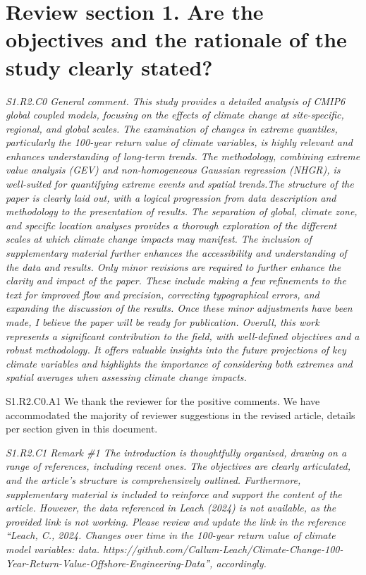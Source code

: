 \documentclass[a4paper,10pt]{article}
\begin{document}
	\section*{Review section 1. Are the objectives and the rationale of the study clearly stated?}
	\emph{S1.R2.C0 General comment. This study provides a detailed analysis of CMIP6 global coupled models, focusing on the effects of climate change at site-specific, regional, and global scales. The examination of changes in extreme quantiles, particularly the 100-year return value of climate variables, is highly relevant and enhances understanding of long-term trends. The methodology, combining extreme value analysis (GEV) and non-homogeneous Gaussian regression (NHGR), is well-suited for quantifying extreme events and spatial trends.The structure of the paper is clearly laid out, with a logical progression from data description and methodology to the presentation of results. The separation of global, climate zone, and specific location analyses provides a thorough exploration of the different scales at which climate change impacts may manifest. The inclusion of supplementary material further enhances the accessibility and understanding of the data and results. Only minor revisions are required to further enhance the clarity and impact of the paper. These include making a few refinements to the text for improved flow and precision, correcting typographical errors, and expanding the discussion of the results. Once these minor adjustments have been made, I believe the paper will be ready for publication. Overall, this work represents a significant contribution to the field, with well-defined objectives and a robust methodology. It offers valuable insights into the future projections of key climate variables and highlights the importance of considering both extremes and spatial averages when assessing climate change impacts.}
	
	S1.R2.C0.A1 We thank the reviewer for the positive comments. We have accommodated the majority of reviewer suggestions in the revised article, details per section given in this document.
		
	\emph{S1.R2.C1 Remark \#1 The introduction is thoughtfully organised, drawing on a range of references, including recent ones. The objectives are clearly articulated, and the article’s structure is comprehensively outlined. Furthermore, supplementary material is included to reinforce and support the content of the article. However, the data referenced in Leach (2024) is not available, as the provided link is not working. Please review and update the link in the reference “Leach, C., 2024. Changes over time in the 100-year return value of climate model variables: data. https://github.com/Callum-Leach/Climate-Change-100-Year-Return-Value-Offshore-Engineering-Data”, accordingly.}
	
\end{document}
